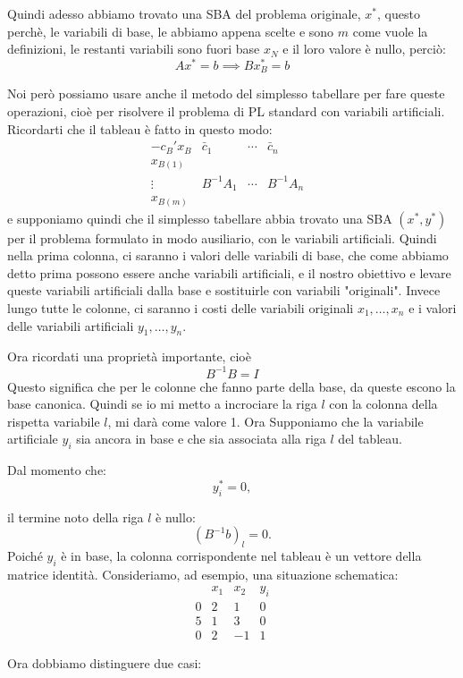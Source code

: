 Quindi adesso abbiamo trovato una SBA del problema originale, $x^*$, questo perchè, le variabili di base, le abbiamo appena scelte e sono $m$ come vuole la definizioni, le restanti variabili sono fuori base $x_N$ e il loro valore è nullo, perciò:
\[
A x^* = b \implies B x^*_B = b
\]

Noi però possiamo usare anche il metodo del simplesso tabellare per fare queste operazioni, cioè per risolvere il problema di PL standard con variabili artificiali.
Ricordarti che il tableau è fatto in questo modo:
\[
\boxed{
\begin{array}{c|cccc}
-c_B' x_B & \bar{c}_1 & \cdots & \bar{c}_n \\
\hline
x_{B(1)} & & & & \\
\vdots & B^{-1}A_1 & \cdots & B^{-1}A_n & \\
x_{B(m)} & & & &
\end{array}
}
\]
e supponiamo quindi che il simplesso tabellare abbia trovato una SBA $(x^*,y^*)$ per il problema formulato in modo ausiliario, con le variabili artificiali.
Quindi nella prima colonna, ci saranno i valori delle variabili di base, che come abbiamo detto prima possono essere anche variabili artificiali, e il nostro obiettivo e levare queste variabili artificiali dalla base e sostituirle con variabili "originali".
Invece lungo tutte le colonne, ci saranno i costi delle variabili originali $x_1,\dots,x_n$ e i valori delle variabili artificiali $y_1,\dots,y_n$.

Ora ricordati una proprietà importante, cioè
\[
B^{-1} B = I
\]
Questo significa che per le colonne che fanno parte della base, da queste escono la base canonica.
Quindi se io mi metto a incrociare la riga $l$ con la colonna della rispetta variabile $l$, mi darà come valore 1.
Ora Supponiamo che la variabile artificiale \(y_i\) sia ancora in base e che sia associata alla riga \(l\) del tableau.

Dal momento che:
\[
y_i^*=0,
\]

il termine noto della riga \(l\) è nullo:
\[
(B^{-1}b)_l=0.
\]
Poiché \(y_i\) è in base, la colonna corrispondente nel tableau è un vettore della matrice identità.
Consideriamo, ad esempio, una situazione schematica:
\[
\begin{array}{c|ccc}
 &x_1&x_2&y_i\\
\hline
0&2&1&0\\
5&1&3&0\\
0&\boxed{2}&-1&1
\end{array}
\]

Ora dobbiamo distinguere due casi:

